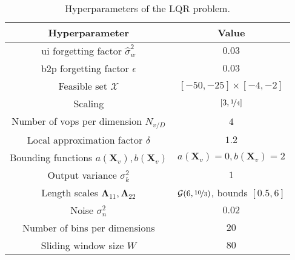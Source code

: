 \bgroup
\def\arraystretch{1}
\begin{table}[h]
    \small
    \centering
    \begin{tabular}{c||c}
        \textbf{Hyperparameter} & \textbf{Value} \\\hline\hline
        \gls{ui} forgetting factor $\hat{\sigma}_w^2$ & $0.03$\\
        \gls{b2p} forgetting factor $\epsilon$ & $0.03$\\
        Feasible set $\mathcal{X}$ & $[-50,-25] \times [-4, -2]$\\
        Scaling & $[3,\nicefrac{1}{4}]$\\
        Number of \glspl{vop} per dimension $N_{v/D}$ & $4$\\
        Local approximation factor $\delta$ & $1.2$\\
        Bounding functions $a(\mathbf{X}_v),b(\mathbf{X}_v)$ & $a(\mathbf{X}_v)=0,b(\mathbf{X}_v)=2$\\
        Output variance $\sigma_k^2$ & $1$\\
        Length scales $\boldsymbol\Lambda_{11}, \boldsymbol\Lambda_{22}$ & $\mathcal{G}(6, \nicefrac{10}{3})$, bounds $[0.5, 6]$\\
        Noise $\sigma_n^2$ & $0.02$ \\
        Number of bins per dimensions & $20$ \\
        Sliding window size $W$ & $80$
    \end{tabular}
    \caption{Hyperparameters of the LQR problem.}
    \label{tab:params_LQR}
\end{table}
\egroup